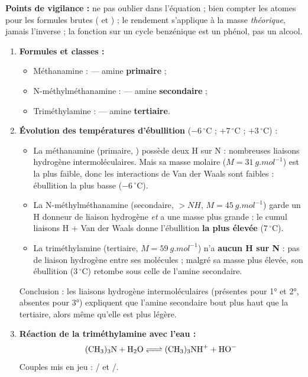 \documentclass[11pt]{article}
\begin{document}
\begin{corrige}
\textbf{Points de vigilance :} ne pas oublier  dans l'équation ; bien compter les atomes pour les formules brutes ( et ) ; le rendement s'applique à la masse \emph{théorique}, jamais l'inverse ; la fonction  sur un cycle benzénique est un phénol, pas un alcool.
\end{corrige}

\begin{corrige}
\begin{enumerate}
\item \textbf{Formules et classes :}
\begin{itemize}
\item Méthanamine :  — amine \textbf{primaire} ;
\item N-méthylméthanamine :  — amine \textbf{secondaire} ;
\item Triméthylamine :  — amine \textbf{tertiaire}.
\end{itemize}
\item \textbf{Évolution des températures d'ébullition} ($-6\,^{\circ}$C ; $+7\,^{\circ}$C ; $+3\,^{\circ}$C) :
\begin{itemize}
\item La méthanamine (primaire, ) possède deux H sur N : nombreuses liaisons hydrogène intermoléculaires. Mais sa masse molaire ($M = \SI{31}{g.mol^{-1}}$) est la plus faible, donc les interactions de Van der Waals sont faibles : ébullition la plus basse ($-6\,^{\circ}$C).
\item La N-méthylméthanamine (secondaire, $>NH$, $M = \SI{45}{g.mol^{-1}}$) garde un H donneur de liaison hydrogène \emph{et} a une masse plus grande : le cumul liaisons H + Van der Waals donne l'ébullition \textbf{la plus élevée} ($7\,^{\circ}$C).
\item La triméthylamine (tertiaire, $M = \SI{59}{g.mol^{-1}}$) n'a \textbf{aucun H sur N} : pas de liaison hydrogène entre ses molécules ; malgré sa masse plus élevée, son ébullition ($3\,^{\circ}$C) retombe sous celle de l'amine secondaire.
\end{itemize}
Conclusion : les liaisons hydrogène intermoléculaires (présentes pour 1° et 2°, absentes pour 3°) expliquent que l'amine secondaire bout plus haut que la tertiaire, alors même qu'elle est plus légère.
\item \textbf{Réaction de la triméthylamine avec l'eau :} \[ \ce{(CH3)3N + H2O <=> (CH3)3NH+ + HO-} \] Couples mis en jeu : / et /.

\end{enumerate}
\end{corrige}
\end{document}
